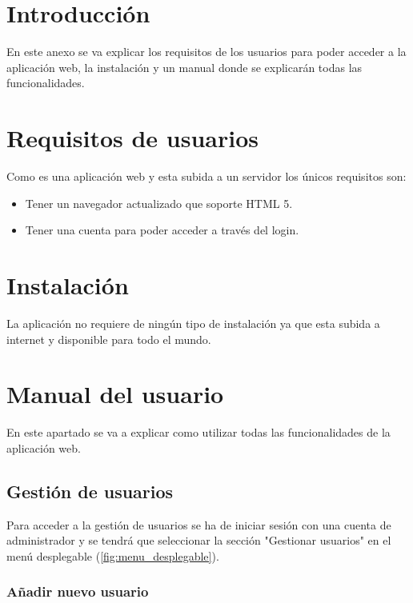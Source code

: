 
\section{Introducción}

En este anexo se va explicar los requisitos de los usuarios para poder acceder a la aplicación web, la instalación y un manual donde se explicarán todas las funcionalidades.

\section{Requisitos de usuarios}

Como es una aplicación web y esta subida a un servidor los únicos requisitos son:
\begin{itemize}
    \item Tener un navegador actualizado que soporte HTML 5.
    \item Tener una cuenta para poder acceder a través del login.
\end{itemize}

\section{Instalación}

La aplicación no requiere de ningún tipo de instalación ya que esta subida a internet y disponible para todo el mundo.

\section{Manual del usuario}

En este apartado se va a explicar como utilizar todas las funcionalidades de la aplicación web.

\subsection{Gestión de usuarios}

Para acceder a la gestión de usuarios se ha de iniciar sesión con una cuenta de administrador y se tendrá que seleccionar la sección "Gestionar usuarios"{} en el menú desplegable (\ref{fig:menu_desplegable}).


\subsubsection{Añadir nuevo usuario}

